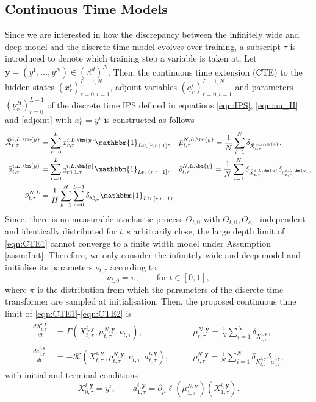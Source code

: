 \documentclass{article}
\newcommand{\R}{\mathbb{R}}
\begin{document}
\subsection{Continuous Time Models}\label{cont_time}
Since we are interested in how the discrepancy between the infinitely wide and deep model and the discrete-time model evolves over training, a subscript $\tau$ is introduced to denote which training step a variable is taken at. Let $\bm{y} =(y^1,\ldots, y^N)\in (\R^d)^N$. Then, the continuous time extension (CTE) to the hidden states $(x^i_r)_{r=0,i=1}^{L-1,N}$, adjoint variables $(\underline{a}^i_r)_{r=0,i=1}^{L-1,N}$ and parameters $(\underline{\nu}^H_r)_{r=0}^{L-1}$ of the discrete time IPS defined in equations \eqref{eqn:IPS}, \eqref{eqn:nu_H} and \eqref{adjoint} with $x^i_0=y^i$ is constructed as follows
\begin{align}\label{eqn:CTE1}
    \bar X^{i,L,\bm{y}}_{t,\tau} &= \sum_{r=0}^L x^{i,L,\bm{y}}_{r,\tau} \mathbbm{1}_{Lt \in[r,r+1)}, \quad \bar \mu^{N,L,\bm{y}}_{t,\tau}= \frac{1}{N}\sum_{i=1}^N \delta_{\bar X^{i,L,\bm{y}}_{t,\tau}},\\
    \bar a^{i,L,\bm{y}}_{t,\tau} &= \sum_{r=0}^L \underline{a}^{i,L,\bm{y}}_{r+1,\tau} \mathbbm{1}_{Lt \in(r,r+1]}, \quad \bar \rho^{N,L,\bm{y}}_{t,\tau}= \frac{1}{N}\sum_{i=1}^N \delta_{\bar X^{i,L,\bm{y}}_{t,\tau}}\delta_{\bar a^{i,L,\bm{y}}_{t,\tau}},\\
    \bar \nu^{N,L}_{t,\tau}&=\frac{1}{H}\sum_{h=1}^H \sum_{r=0}^{L-1}\delta_{\theta_{r,\tau}^h}\mathbbm{1}_{Lt \in[r,r+1)}.\label{eqn:CTE2}
\end{align}
Since, there is no measurable stochastic process $\Theta_{t,0}$ with $\Theta_{t,0},\Theta_{s,0}$ independent and identically distributed for $t,s$ arbitrarily close, the large depth limit of \eqref{eqn:CTE1} cannot converge to a finite width model under Assumption \ref{assm:Init}. Therefore, we only consider the infinitely wide and deep model and initialise its parameters $\nu_{t,\tau}$  according to
\begin{equation*}\label{eqn:initContinuousModel}
     \nu_{t,0} = \pi, \qquad \text{for} \; t\in[0,1],
 \end{equation*}  
 where $\pi$ is the distribution from which the parameters of the discrete-time transformer are sampled at initialisation. Then, the proposed continuous time limit of \eqref{eqn:CTE1}-\eqref{eqn:CTE2} is 
\begin{align}\label{eqn:ansatz}
    \frac{dX^{i,\bm{y}}_{t,\tau}}{dt} &=  \Gamma(X^{i,\bm{y}}_{t,\tau},\mu^{N,\bm{y}}_{t,\tau},\nu_{t,\tau}),\qquad&\mu^{N,\bm{y}}_{t,\tau}= \frac{1}{N}\sum_{i=1}^N\delta_{X^{i,\bm{y}}_{t,\tau}},\\    \frac{da^{i,\bm{y}}_{t,\tau}}{dt} &= - \mathcal K(X^{i,\bm{y}}_{t,\tau},\rho^{N,\bm{y}}_{t,\tau}, \nu_{t,\tau},a^{i,\bm{y}}_{t,\tau}),\qquad & \rho^{N,\bm{y}}_{t,\tau} =\frac{1}{N} \sum_{i=1}^N \delta_{X^{i,\bm{y}}_{t,\tau}}\delta_{a^{i,\bm{y} }_{t,\tau}},
\end{align}
with initial and terminal conditions
\begin{equation}\label{eqn:anstaz_IC}
    X^{i,\bm{y}}_{0,\tau}=y^i,\qquad a^{i,\bm{y}}_{1,\tau} = \partial_\mu \ell(\mu^{N,\bm{y}}_{1,\tau})(X^{i,\bm{y}}_{1,\tau}).
\end{equation}
\end{document}
